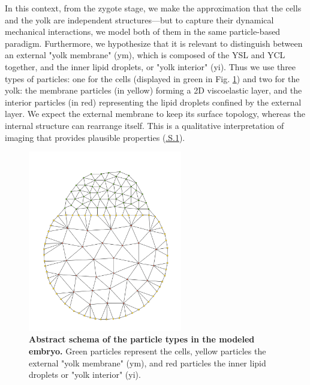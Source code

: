 In this context, from the zygote stage, we make the approximation that the cells and the yolk are independent structures---but to capture their dynamical mechanical interactions, we model both of them in the same particle-based paradigm. Furthermore, we hypothesize that it is relevant to distinguish between an external "yolk membrane" (ym), which is composed of the YSL and YCL together, and the inner lipid droplets, or "yolk interior" (yi). Thus we use three types of particles: one for the cells (displayed in green in Fig. \ref{Case_0_Yolk_general_particles_yolk}) and two for the yolk: the membrane particles (in yellow) forming a 2D viscoelastic layer, and the interior particles (in red) representing the lipid droplets confined by the external layer. We expect the external membrane to keep its surface topology, whereas the internal structure can rearrange itself. This is a qualitative interpretation of imaging that provides plausible properties (\href{http://public.iscpif.fr/~delile/morphogenesis/manuscript/pragma/figure.html?name=Case_0_Yolk_1_THG_imaging_the_zebrafish_embryo_from_the_one_cell_stage}{.S.1}).
\begin{figure}
\begin{center}
\includegraphics[width=0.6\textwidth]{../../images/Cases_Studies/Case_0_Yolk/general_particles_yolk.png}
\end{center}
\caption{\textbf{Abstract schema of the particle types in the modeled embryo.} Green particles represent the cells, yellow particles the external "yolk membrane" (ym), and red particles the inner lipid droplets or "yolk interior" (yi).}
\label{Case_0_Yolk_general_particles_yolk}
\end{figure}

